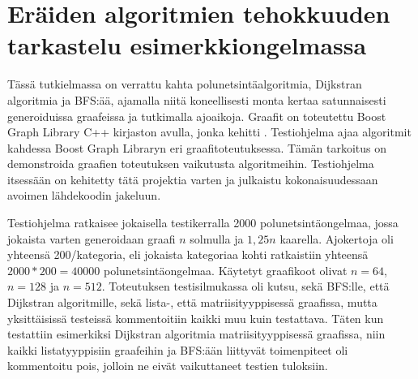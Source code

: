 \chapter{Eräiden algoritmien tehokkuuden tarkastelu esimerkkiongelmassa}\label{benchmarking}

Tässä tutkielmassa on verrattu kahta polunetsintäalgoritmia, Dijkstran 
algoritmia ja BFS:ää, ajamalla niitä koneellisesti monta kertaa satunnaisesti 
generoiduissa graafeissa ja tutkimalla ajoaikoja. Graafit on toteutettu
Boost Graph Library C++ kirjaston avulla, jonka kehitti \textcite{bgl}. 
Testiohjelma ajaa algoritmit kah\-des\-sa Boost Graph Libraryn eri 
graafitoteutuksessa. Tämän tarkoitus on de\-mons\-troida graafien toteutuksen 
vaikutusta algoritmeihin. Testiohjelma itsessään on kehitetty tätä 
projektia varten ja julkaistu kokonaisuudessaan avoimen lähdekoodin 
jakeluun.~\cite{gt2} \par
	Testiohjelma ratkaisee jokaisella testikerralla 2000 
polunetsintäongelmaa, jossa jokaista varten generoidaan graafi $n$ solmulla 
ja $1,25n$ kaarella. Ajokertoja oli yhteensä 200/kategoria, eli jokaista 
kategoriaa kohti ratkaistiin yhteensä $2000*200 = 40 000$ 
polunetsintäongelmaa. Käytetyt graafikoot olivat $n=64$, $n=128$ ja $n=512$. 
Toteutuksen testisilmukassa oli kutsu, sekä BFS:lle, että Dijkstran 
algoritmille, sekä lista-, että matriisityyppisessä graafissa, 
mutta yksittäisissä testeissä kommentoitiin kaikki muu kuin testattava. Täten 
kun testattiin esimerkiksi Dijkstran algoritmia matriisityyppisessä graafissa, 
niin kaikki listatyyppisiin graafeihin ja BFS:ään liittyvät toimenpiteet oli 
kommentoitu pois, jolloin ne eivät vaikuttaneet testien tuloksiin.~\cite{gt2} 
\par

